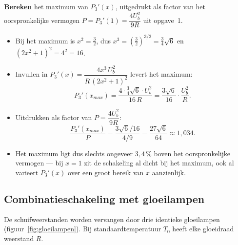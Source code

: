 \documentclass[addpoints,11pt,a4paper]{exam}
\begin{document}
\begin{questions}
\question[4]
\textbf{Bereken} het maximum van $P_3'(x)$, uitgedrukt als factor van het oorspronkelijke vermogen $P = P_3'(1) = \dfrac{4U_b^2}{9R}$ uit opgave~1.

\begin{solution}
\begin{itemize}
  \item Bij het maximum is $x^2 = \tfrac{3}{2}$, dus $x^3 = \left(\tfrac{3}{2}\right)^{3/2} = \tfrac{3}{4}\sqrt{6}$ en $(2x^2+1)^2 = 4^2 = 16$.
  \item Invullen in $P_3'(x) = \dfrac{4x^3\,U_b^2}{R\,(2x^2+1)^2}$ levert het maximum:
    \[P_3'(x_{max}) = \dfrac{4 \cdot \tfrac{3}{4}\sqrt{6} \cdot U_b^2}{16\,R} = \dfrac{3\sqrt{6}}{16}\cdot \dfrac{U_b^2}{R}.\]
  \item Uitdrukken als factor van $P = \dfrac{4U_b^2}{9R}$:
    \[\dfrac{P_3'(x_{max})}{P} = \dfrac{3\sqrt{6}/16}{4/9} = \dfrac{27\sqrt{6}}{64} \approx 1{,}034.\]
  \item Het maximum ligt dus slechts ongeveer $3{,}4\,\%$ boven het oorspronkelijke vermogen --- bij $x=1$ zit de schakeling al dicht bij het maximum, ook al varieert $P_3'(x)$ over een groot bereik van $x$ aanzienlijk.
\end{itemize}
\end{solution}

\newpage
\subsection*{Combinatieschakeling met gloeilampen}
\item[]

De schuifweerstanden worden vervangen door drie identieke gloeilampen (figuur~\ref{fig:gloeilampen}). Bij standaardtemperatuur $T_0$ heeft elke gloeidraad weerstand $R$.



\end{questions}
\end{document}
